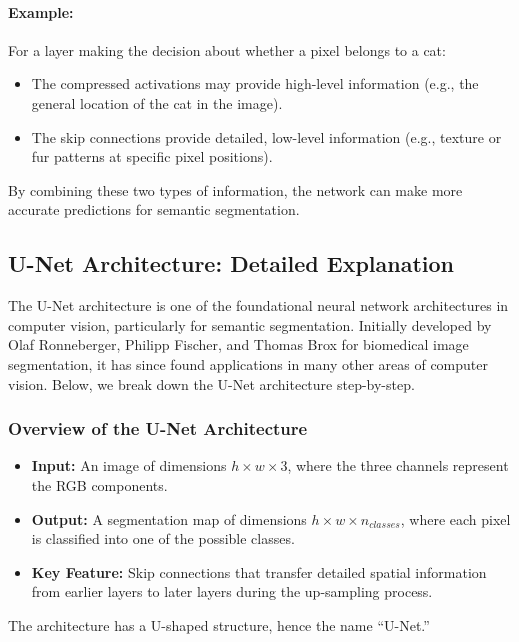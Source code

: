 \documentclass[letterpaper,12pt,notitlepage,twoside]{report}
\begin{document}
\paragraph{Example:}
For a layer making the decision about whether a pixel belongs to a cat:
\begin{itemize}
    \item The compressed activations may provide high-level information (e.g., the general location of the cat in the image).
    \item The skip connections provide detailed, low-level information (e.g., texture or fur patterns at specific pixel positions).
\end{itemize}

By combining these two types of information, the network can make more accurate predictions for semantic segmentation.

\subsection*{U-Net Architecture: Detailed Explanation}
The U-Net architecture is one of the foundational neural network architectures in computer vision, particularly for semantic segmentation. Initially developed by Olaf Ronneberger, Philipp Fischer, and Thomas Brox for biomedical image segmentation, it has since found applications in many other areas of computer vision. Below, we break down the U-Net architecture step-by-step.

\subsubsection*{Overview of the U-Net Architecture}

\begin{itemize}
    \item \textbf{Input:} An image of dimensions \( h \times w \times 3 \), where the three channels represent the RGB components.
    \item \textbf{Output:} A segmentation map of dimensions \( h \times w \times n_{classes} \), where each pixel is classified into one of the possible classes.
    \item \textbf{Key Feature:} Skip connections that transfer detailed spatial information from earlier layers to later layers during the up-sampling process.
\end{itemize}

The architecture has a U-shaped structure, hence the name ``U-Net.''
\end{document}

